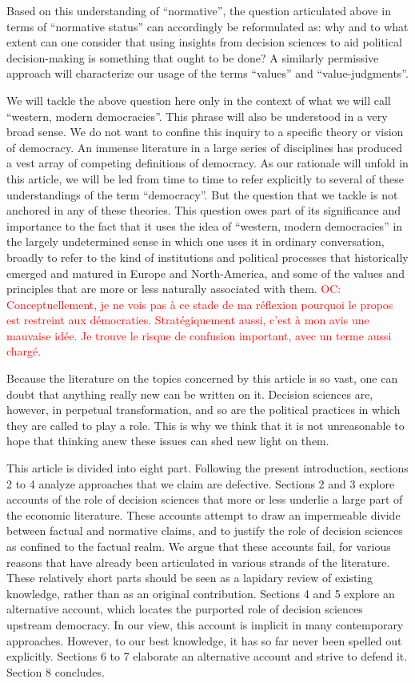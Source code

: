 \documentclass[preprint,11pt]{elsarticle}
\newcommand{\commentOC}[1]{\textcolor{red}{OC: #1}}
\begin{document}
Based on this understanding of ``normative'', the question articulated above in terms of ``normative status'' can accordingly be reformulated as: why and to what extent can one consider that using insights from decision sciences to aid political decision-making is something that ought to be done? A similarly permissive approach will characterize our usage of the terms ``values'' and ``value-judgments''.

We will tackle the above question here only in the context of what we will call ``western, modern democracies''. This phrase will also be understood in a very broad sense. We do not want to confine this inquiry to a specific theory or vision of democracy. An immense literature in a large series of disciplines has produced a vest array of competing definitions of democracy. As our rationale will unfold in this article, we will be led from time to time to refer explicitly to several of these understandings of the term ``democracy''. But the question that we tackle is not anchored in any of these theories. This question owes part of its significance and importance to the fact that it uses the idea of “western, modern democracies” in the largely undetermined sense in which one uses it in ordinary conversation, broadly to refer to the kind of institutions and political processes that historically emerged and matured in Europe and North-America, and some of the values and principles that are more or less naturally associated with them.
\commentOC{Conceptuellement, je ne vois pas à ce stade de ma réflexion pourquoi le propos est restreint aux démocraties. Stratégiquement aussi, c’est à mon avis une mauvaise idée. Je trouve le risque de confusion important, avec un terme aussi chargé.}

Because the literature on the topics concerned by this article is so vast, one can doubt that anything really new can be written on it. Decision sciences are, however, in perpetual transformation, and so are the political practices in which they are called to play a role. This is why we think that it is not unreasonable to hope that thinking anew these issues can shed new light on them.

This article is divided into eight part. Following the present introduction, sections 2 to 4 analyze approaches that we claim are defective. Sections 2 and 3 explore accounts of the role of decision sciences that more or less underlie a large part of the economic literature. These accounts attempt to draw an impermeable divide between factual and normative claims, and to justify the role of decision sciences as confined to the factual realm. We argue that these accounts fail, for various reasons that have already been articulated in various strands of the literature. These relatively short parts should be seen as a lapidary review of existing knowledge, rather than as an original contribution. Sections 4 and 5 explore an alternative account, which locates the purported role of decision sciences upstream democracy. In our view, this account is implicit in many contemporary approaches. However, to our best knowledge, it has so far never been spelled out explicitly. Sections 6 to 7 elaborate an alternative account and strive to defend it. Section 8 concludes.
\end{document}
